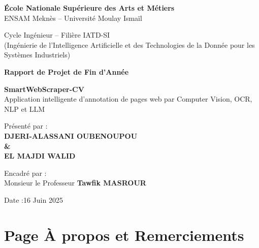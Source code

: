 \documentclass[12pt,a4paper]{report}
\begin{document}
\begin{titlepage}
\centering
\vspace{2cm}

{\Large \textbf{École Nationale Supérieure des Arts et Métiers}}\\
\vspace{0.5cm}
{\large ENSAM Meknès – Université Moulay Ismaïl}\\
\vspace{1cm}

{\large Cycle Ingénieur – Filière IATD-SI}\\
{\small (Ingénierie de l'Intelligence Artificielle et des Technologies de la Donnée pour les Systèmes Industriels)}\\

\vspace{3cm}

{\Huge \textbf{Rapport de Projet de Fin d'Année}}\\

\vspace{2cm}

{\LARGE \textbf{SmartWebScraper-CV}}\\
\vspace{0.5cm}
{\Large Application intelligente d'annotation de pages web par Computer Vision, OCR, NLP et LLM}\\

\vspace{3cm}

{\large Présenté par :}\\
{\Large \textbf{DJERI-ALASSANI OUBENOUPOU}}\\
{\Large \textbf{             \&           }}\\
{\Large \textbf{EL MAJDI WALID}}\\

\vspace{1.5cm}

{\large Encadré par :}\\
{\Large Monsieur le Professeur \textbf{Tawfik MASROUR}}\\

\vspace{2cm}

{\large Date :16 Juin 2025}

\end{titlepage}

\tableofcontents
\newpage

\chapter*{ Page À propos et Remerciements}
\end{document}
